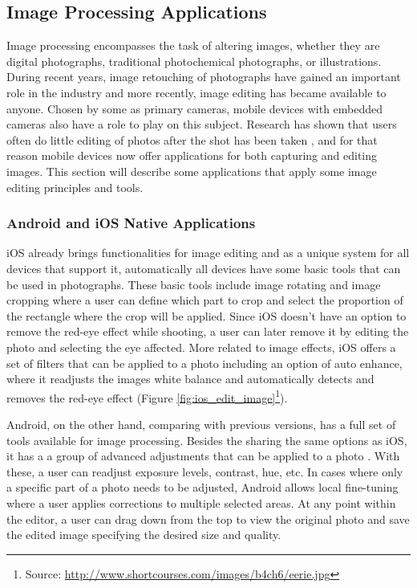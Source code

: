\subsection{Image Processing Applications}

Image processing encompasses the task of altering images, whether they are digital photographs, traditional photochemical photographs, or illustrations. During recent years, image retouching of photographs have gained an important role in the industry and more recently, image editing has became available to anyone. Chosen by some as primary cameras, mobile devices with embedded cameras also have a role to play on this subject. Research has shown that users often do little editing of photos after the shot has been taken \cite{brewster2012rethinking}, and for that reason mobile devices now offer applications for both capturing and editing images. This section will describe some applications that apply some image editing principles and tools.
 
\subsubsection{Android and iOS Native Applications}

iOS already brings functionalities for image editing and as a unique system for all devices that support it, automatically all devices have some basic tools that can be used in photographs.
These basic tools include image rotating and image cropping where a user can define which part to crop and select the proportion of the rectangle where the crop will be applied.
Since iOS doesn't have an option to remove the red-eye effect while shooting, a user can later remove it by editing the photo and selecting the eye affected. More related to image effects, iOS offers a set of filters that can be applied to a photo including an option of auto enhance, where it readjusts the images white balance and automatically detects and removes the red-eye effect (Figure \ref{fig:ios_edit_image}\footnote{Source: \url{http://www.shortcourses.com/images/b4ch6/eerie.jpg}}).

Android, on the other hand, comparing with previous versions, has a full set of tools available for image processing. Besides the sharing the same options as iOS, it has a a group of advanced adjustments that can be applied to a photo \cite{Sharon}. With these, a user can readjust exposure levels, contrast, hue, etc. In cases where only a specific part of a photo needs to be adjusted, Android allows local fine-tuning where a user applies corrections to multiple selected areas. At any point within the editor, a user can drag down from the top to view the original photo and save the edited image specifying the desired size and quality.

